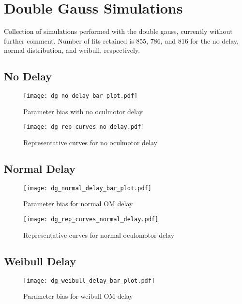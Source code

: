\section{Double Gauss Simulations}

Collection of simulations performed with the double gauss, currently without further comment. Number of fits retained is 855, 786, and 816 for the no delay, normal distribution, and weibull, respectively.

\subsection{No Delay}


\begin{figure}[H]
\centering
\texttt{[image: dg\_no\_delay\_bar\_plot.pdf]} 
\caption{Parameter bias with no oculmotor delay}
\label{fig:dg_par_bias_no_delay}
\end{figure}

\begin{figure}[H]
\centering
\texttt{[image: dg\_rep\_curves\_no\_delay.pdf]}
\caption{Representative curves for no oculmotor delay}
\label{fig:dg_rep_curves_no_delay}
\end{figure}


\subsection{Normal Delay}


\begin{figure}[H]
\centering
\texttt{[image: dg\_normal\_delay\_bar\_plot.pdf]} 
\caption{Parameter bias for normal OM delay}
\label{fig:dg_par_bias_normal_delay}
\end{figure}

\begin{figure}[H]
\centering
\texttt{[image: dg\_rep\_curves\_normal\_delay.pdf]}
\caption{Representative curves for normal oculomotor delay}
\label{fig:dg_rep_curves_normal_delay}
\end{figure}

\subsection{Weibull Delay}

\begin{figure}[H]
\centering
\texttt{[image: dg\_weibull\_delay\_bar\_plot.pdf]} 
\caption{Parameter bias for weibull OM delay}
\label{fig:dg_par_bias_weibull_delay}
\end{figure}

